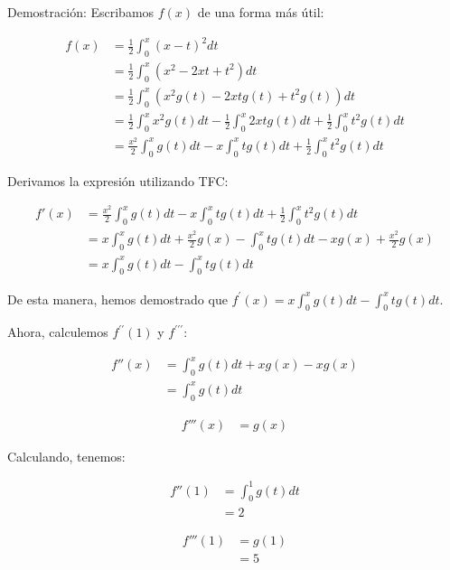 \documentclass{report}
\begin{document}
\begin{enumerate}
        Demostración: Escribamos $f(x)$ de una forma más útil:
        
        \begin{align*}
        f(x) &= \frac{1}{2}\int_{0}^{x}(x-t)^2dt \\
        &= \frac{1}{2}\int_{0}^{x}(x^2-2xt+t^2)dt \\
        &= \frac{1}{2}\int_{0}^{x}(x^2g(t)-2xtg(t)+t^2g(t))dt \\
        &= \frac{1}{2}\int_{0}^{x}x^2g(t)dt - \frac{1}{2}\int_{0}^{x}2xtg(t)dt + \frac{1}{2}\int_{0}^{x}t^2g(t)dt \\
        &= \frac{x^2}{2}\int_{0}^{x}g(t)dt - x\int_{0}^{x}tg(t)dt + \frac{1}{2}\int_{0}^{x}t^2g(t)dt
        \end{align*}
        
        Derivamos la expresión utilizando TFC:
        
        \begin{align*}
        f'(x) &= \frac{x^2}{2}\int_{0}^{x}g(t)dt - x\int_{0}^{x}tg(t)dt + \frac{1}{2}\int_{0}^{x}t^2g(t)dt \\
        &= x\int_{0}^{x}g(t)dt + \frac{x^2}{2}g(x) - \int_{0}^{x}tg(t)dt - xg(x) + \frac{x^2}{2}g(x) \\
        &= x\int_{0}^{x}g(t)dt - \int_{0}^{x}tg(t)dt
        \end{align*}
        
        De esta manera, hemos demostrado que $f^{\prime}(x)=x \int_{0}^{x} g(t) d t-\int_{0}^{x} t g(t) d t$.
        
        Ahora, calculemos $f^{\prime \prime}(1)$ y $f^{\prime \prime \prime}$:
        
        \begin{align*}
        f''(x) &= \int_{0}^{x}g(t)dt + xg(x) - xg(x) \\
        &= \int_{0}^{x}g(t)dt
        \end{align*}
        
        \begin{align*}
        f'''(x) &= g(x)
        \end{align*}
        
        Calculando, tenemos:
        
        \begin{align*}
        f''(1) &= \int_{0}^{1}g(t)dt \\
        &= 2
        \end{align*}
        
        \begin{align*}
        f'''(1) &= g(1) \\
        &= 5
        \end{align*}
        

\end{enumerate}
\end{document}
